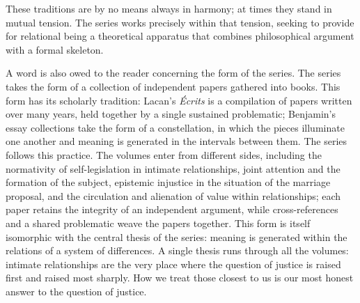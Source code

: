 \documentclass[11pt]{book}
\begin{document}
These traditions are by no means always in harmony; at times they stand in mutual tension. The series works precisely within that tension, seeking to provide for relational being a theoretical apparatus that combines philosophical argument with a formal skeleton.

A word is also owed to the reader concerning the form of the series. The series takes the form of a collection of independent papers gathered into books. This form has its scholarly tradition: Lacan's \emph{\'Ecrits} is a compilation of papers written over many years, held together by a single sustained problematic; Benjamin's essay collections take the form of a constellation, in which the pieces illuminate one another and meaning is generated in the intervals between them. The series follows this practice. The volumes enter from different sides, including the normativity of self-legislation in intimate relationships, joint attention and the formation of the subject, epistemic injustice in the situation of the marriage proposal, and the circulation and alienation of value within relationships; each paper retains the integrity of an independent argument, while cross-references and a shared problematic weave the papers together. This form is itself isomorphic with the central thesis of the series: meaning is generated within the relations of a system of differences. A single thesis runs through all the volumes: intimate relationships are the very place where the question of justice is raised first and raised most sharply. How we treat those closest to us is our most honest answer to the question of justice.
\end{document}
